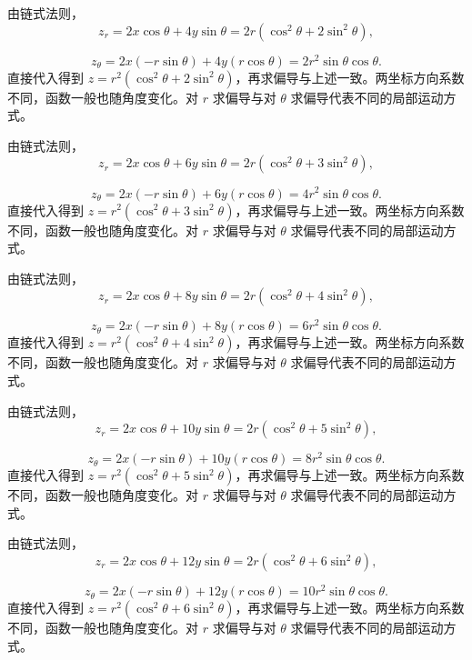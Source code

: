 \documentclass[12pt,fontset=fandol]{ctexart}
\begin{document}
\begin{solve}\label{ans:c33q8}
由链式法则，
\[
z_r=2x\cos\theta+4y\sin\theta=2r(\cos^2\theta+2\sin^2\theta),
\]

\[
z_\theta=2x(-r\sin\theta)+4y(r\cos\theta)=2r^2\sin\theta\cos\theta.
\]
直接代入得到 $z=r^2(\cos^2\theta+2\sin^2\theta)$，再求偏导与上述一致。两坐标方向系数不同，函数一般也随角度变化。对 $r$ 求偏导与对 $\theta$ 求偏导代表不同的局部运动方式。
\end{solve}

\begin{solve}\label{ans:c33q9}
由链式法则，
\[
z_r=2x\cos\theta+6y\sin\theta=2r(\cos^2\theta+3\sin^2\theta),
\]

\[
z_\theta=2x(-r\sin\theta)+6y(r\cos\theta)=4r^2\sin\theta\cos\theta.
\]
直接代入得到 $z=r^2(\cos^2\theta+3\sin^2\theta)$，再求偏导与上述一致。两坐标方向系数不同，函数一般也随角度变化。对 $r$ 求偏导与对 $\theta$ 求偏导代表不同的局部运动方式。
\end{solve}

\begin{solve}\label{ans:c33q10}
由链式法则，
\[
z_r=2x\cos\theta+8y\sin\theta=2r(\cos^2\theta+4\sin^2\theta),
\]

\[
z_\theta=2x(-r\sin\theta)+8y(r\cos\theta)=6r^2\sin\theta\cos\theta.
\]
直接代入得到 $z=r^2(\cos^2\theta+4\sin^2\theta)$，再求偏导与上述一致。两坐标方向系数不同，函数一般也随角度变化。对 $r$ 求偏导与对 $\theta$ 求偏导代表不同的局部运动方式。
\end{solve}

\begin{solve}\label{ans:c33q11}
由链式法则，
\[
z_r=2x\cos\theta+10y\sin\theta=2r(\cos^2\theta+5\sin^2\theta),
\]

\[
z_\theta=2x(-r\sin\theta)+10y(r\cos\theta)=8r^2\sin\theta\cos\theta.
\]
直接代入得到 $z=r^2(\cos^2\theta+5\sin^2\theta)$，再求偏导与上述一致。两坐标方向系数不同，函数一般也随角度变化。对 $r$ 求偏导与对 $\theta$ 求偏导代表不同的局部运动方式。
\end{solve}

\begin{solve}\label{ans:c33q12}
由链式法则，
\[
z_r=2x\cos\theta+12y\sin\theta=2r(\cos^2\theta+6\sin^2\theta),
\]

\[
z_\theta=2x(-r\sin\theta)+12y(r\cos\theta)=10r^2\sin\theta\cos\theta.
\]
直接代入得到 $z=r^2(\cos^2\theta+6\sin^2\theta)$，再求偏导与上述一致。两坐标方向系数不同，函数一般也随角度变化。对 $r$ 求偏导与对 $\theta$ 求偏导代表不同的局部运动方式。
\end{solve}
\end{document}
